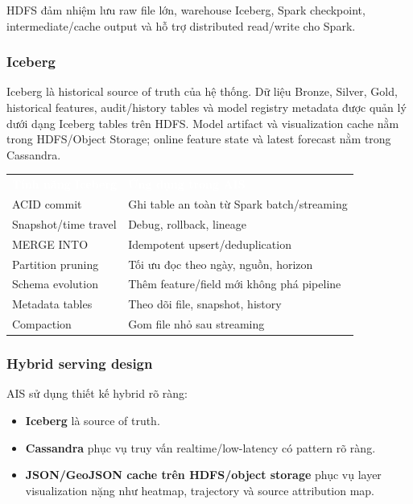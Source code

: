 \documentclass[12pt,a4paper]{article}
\newcommand{\tightlist}{\setlength{\itemsep}{0pt}\setlength{\parskip}{0pt}}
\begin{document}
HDFS đảm nhiệm lưu raw file lớn, warehouse Iceberg, Spark checkpoint, intermediate/cache output và hỗ trợ distributed read/write cho Spark.

\subsubsection{Iceberg}\label{iceberg}

Iceberg là historical source of truth của hệ thống. Dữ liệu Bronze, Silver, Gold, historical features, audit/history tables và model registry metadata được quản lý dưới dạng Iceberg tables trên HDFS. Model artifact và visualization cache nằm trong HDFS/Object Storage; online feature state và latest forecast nằm trong Cassandra.

\begin{longtable}[]{@{}ll@{}}
\arrayrulecolor{HUSTBlue}\toprule\noalign{}
\rowcolor{HUSTBlue}
\textcolor{white}{\textbf{Tính năng Iceberg}} & \textcolor{white}{\textbf{Ứng dụng trong AIS}} \\
\arrayrulecolor{HUSTBlue}\midrule\noalign{}
\endhead
\bottomrule\noalign{}
\endlastfoot
ACID commit & Ghi table an toàn từ Spark batch/streaming \\
Snapshot/time travel & Debug, rollback, lineage \\
MERGE INTO & Idempotent upsert/deduplication \\
Partition pruning & Tối ưu đọc theo ngày, nguồn, horizon \\
Schema evolution & Thêm feature/field mới không phá pipeline \\
Metadata tables & Theo dõi file, snapshot, history \\
Compaction & Gom file nhỏ sau streaming \\
\end{longtable}

\subsubsection{Hybrid serving design}\label{cassandra-hybrid-serving-design}

AIS sử dụng thiết kế hybrid rõ ràng:

\begin{itemize}
\tightlist
\item
  \textbf{Iceberg} là source of truth.
\item
  \textbf{Cassandra} phục vụ truy vấn realtime/low-latency có pattern rõ ràng.
\item
  \textbf{JSON/GeoJSON cache trên HDFS/object storage} phục vụ layer visualization nặng như heatmap, trajectory và source attribution map.
\end{itemize}
\end{document}
